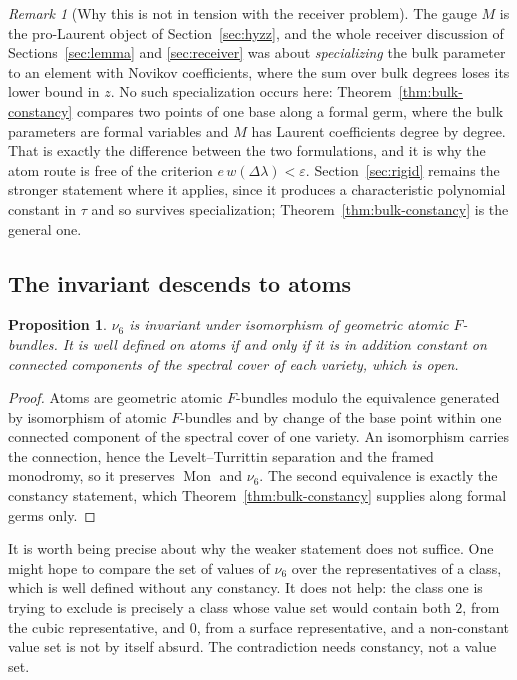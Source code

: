 \documentclass[11pt]{article}
\newtheorem{proposition}[theorem]{Proposition}
\theoremstyle{definition}
\theoremstyle{remark}
\newtheorem{remark}[theorem]{Remark}
\begin{document}
\begin{remark}[Why this is not in tension with the receiver problem]
The gauge $M$ is the pro-Laurent object of Section~\ref{sec:hyzz}, and the whole
receiver discussion of Sections~\ref{sec:lemma} and \ref{sec:receiver} was about
\emph{specializing} the bulk parameter to an element with Novikov coefficients,
where the sum over bulk degrees loses its lower bound in $z$. No such
specialization occurs here: Theorem~\ref{thm:bulk-constancy} compares two points
of one base along a formal germ, where the bulk parameters are formal variables
and $M$ has Laurent coefficients degree by degree. That is exactly the
difference between the two formulations, and it is why the atom route is free of
the criterion $e\,w(\Delta\lambda)<\varepsilon$.
Section~\ref{sec:rigid} remains the stronger statement where it applies, since
it produces a characteristic polynomial constant in $\tau$ and so survives
specialization; Theorem~\ref{thm:bulk-constancy} is the general one.
\end{remark}

\subsection*{The invariant descends to atoms}

\begin{proposition}
\label{prop:nu6-atom}
$\nu_6$ is invariant under isomorphism of geometric atomic $F$-bundles. It is
well defined on atoms if and only if it is in addition constant on connected
components of the spectral cover of each variety, which is open.
\end{proposition}

\begin{proof}
Atoms are geometric atomic $F$-bundles modulo the equivalence generated by
isomorphism of atomic $F$-bundles and by change of the base point within one
connected component of the spectral cover of one variety. An isomorphism carries
the connection, hence the Levelt--Turrittin separation and the framed monodromy,
so it preserves $\operatorname{Mon}$ and $\nu_6$. The second equivalence is
exactly the constancy statement, which Theorem~\ref{thm:bulk-constancy} supplies
along formal germs only.
\end{proof}

It is worth being precise about why the weaker statement does not suffice. One
might hope to compare the set of values of $\nu_6$ over the representatives of a
class, which is well defined without any constancy. It does not help: the class
one is trying to exclude is precisely a class whose value set would contain both
$2$, from the cubic representative, and $0$, from a surface representative, and
a non-constant value set is not by itself absurd. The contradiction needs
constancy, not a value set.
\end{document}
